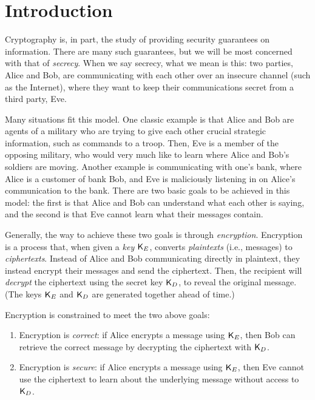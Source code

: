 \chapter*{Introduction}

Cryptography is, in part, the study of providing security guarantees on information. There are many such guarantees, but we will be most concerned with that of \emph{secrecy}. When we say secrecy, what we mean is this: two parties, Alice and Bob, are communicating with each other over an insecure channel (such as the Internet), where they want to keep their communications secret from a third party, Eve.

Many situations fit this model. One classic example is that Alice and Bob are agents of a military who are trying to give each other crucial strategic information, such as commands to a troop. Then, Eve is a member of the opposing military, who would very much like to learn where Alice and Bob's soldiers are moving. Another example is communicating with one's bank, where Alice is a customer of bank Bob, and Eve is maliciously listening in on Alice's communication to the bank. There are two basic goals to be achieved in this model: the first is that Alice and Bob can understand what each other is saying, and the second is that Eve cannot learn what their messages contain.

Generally, the way to achieve these two goals is through \emph{encryption}. Encryption is a process that, when given a \emph{key} ${\sf K}_E$, converts \emph{plaintexts} (i.e., messages) to \emph{ciphertexts}. Instead of Alice and Bob communicating directly in plaintext, they instead encrypt their messages and send the ciphertext. Then, the recipient will \emph{decrypt} the ciphertext using the secret key ${\sf K}_D$, to reveal the original message. (The keys ${\sf K}_E$ and ${\sf K}_D$ are generated together ahead of time.)

Encryption is constrained to meet the two above goals:
\begin{enumerate}
    \item Encryption is \emph{correct}: if Alice encrypts a message using ${\sf K}_E$, then Bob can retrieve the correct message by decrypting the ciphertext with ${\sf K}_D$.
    \item Encryption is \emph{secure}: if Alice encrypts a message using ${\sf K}_E$, then Eve cannot use the ciphertext to learn about the underlying message without access to ${\sf K}_D$.
\end{enumerate}

